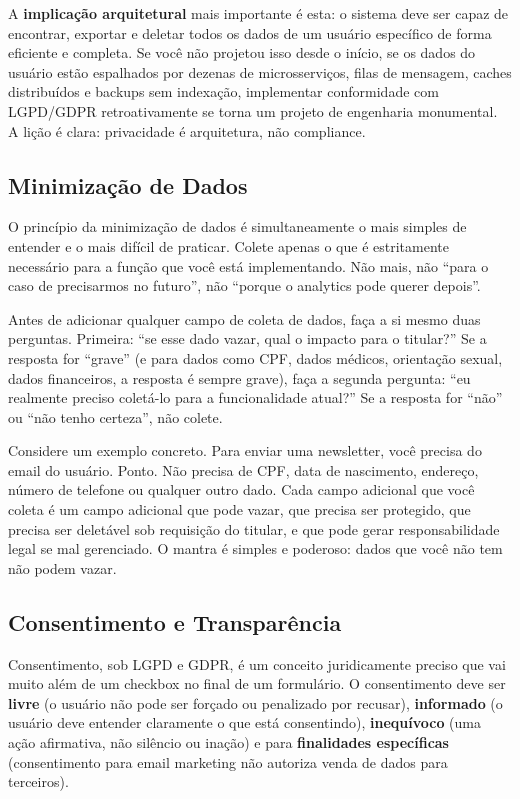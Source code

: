 A \textbf{implicação arquitetural} mais importante é esta: o sistema deve ser
capaz de encontrar, exportar e deletar todos os dados de um usuário específico
de forma eficiente e completa. Se você não projetou isso desde o início, se
os dados do usuário estão espalhados por dezenas de microsserviços, filas de
mensagem, caches distribuídos e backups sem indexação, implementar
conformidade com LGPD/GDPR retroativamente se torna um projeto de engenharia
monumental. A lição é clara: privacidade é arquitetura, não compliance.

\subsection{Minimização de Dados}

O princípio da minimização de dados é simultaneamente o mais simples de entender
e o mais difícil de praticar. Colete apenas o que é estritamente necessário para
a função que você está implementando. Não mais, não ``para o caso de
precisarmos no futuro'', não ``porque o analytics pode querer depois''.

Antes de adicionar qualquer campo de coleta de dados, faça a si mesmo duas
perguntas. Primeira: ``se esse dado vazar, qual o impacto para o titular?'' Se a
resposta for ``grave'' (e para dados como CPF, dados médicos, orientação
sexual, dados financeiros, a resposta é sempre grave), faça a segunda pergunta:
``eu realmente preciso coletá-lo para a funcionalidade atual?'' Se a resposta
for ``não'' ou ``não tenho certeza'', não colete.

Considere um exemplo concreto. Para enviar uma newsletter, você precisa do
email do usuário. Ponto. Não precisa de CPF, data de nascimento, endereço,
número de telefone ou qualquer outro dado. Cada campo adicional que você coleta
é um campo adicional que pode vazar, que precisa ser protegido, que precisa ser
deletável sob requisição do titular, e que pode gerar responsabilidade legal se
mal gerenciado. O mantra é simples e poderoso: dados que você não tem não podem
vazar.

\subsection{Consentimento e Transparência}

Consentimento, sob LGPD e GDPR, é um conceito juridicamente preciso que vai
muito além de um checkbox no final de um formulário. O consentimento deve ser
\textbf{livre} (o usuário não pode ser forçado ou penalizado por recusar),
\textbf{informado} (o usuário deve entender claramente o que está consentindo),
\textbf{inequívoco} (uma ação afirmativa, não silêncio ou inação) e para
\textbf{finalidades específicas} (consentimento para email marketing não
autoriza venda de dados para terceiros).

